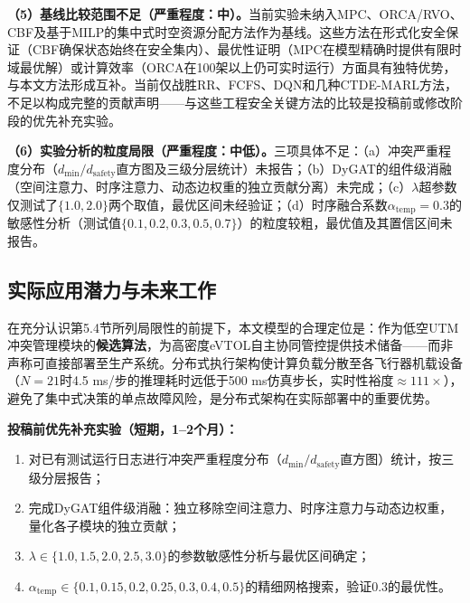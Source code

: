\documentclass[12pt,a4paper,UTF8]{ctexart}
\begin{document}
\textbf{（5）基线比较范围不足（严重程度：中）。}当前实验未纳入MPC\cite{ref27}、ORCA/RVO\cite{ref22}、CBF\cite{ref23}及基于MILP的集中式时空资源分配方法作为基线。这些方法在形式化安全保证（CBF确保状态始终在安全集内）、最优性证明（MPC在模型精确时提供有限时域最优解）或计算效率（ORCA在100架以上仍可实时运行）方面具有独特优势，与本文方法形成互补。当前仅战胜RR、FCFS、DQN和几种CTDE-MARL方法，不足以构成完整的贡献声明——与这些工程安全关键方法的比较是投稿前或修改阶段的优先补充实验。

\textbf{（6）实验分析的粒度局限（严重程度：中低）。}三项具体不足：（a）冲突严重程度分布（$d_{\min}/d_{\text{safety}}$直方图及三级分层统计）未报告；（b）DyGAT的组件级消融（空间注意力、时序注意力、动态边权重的独立贡献分离）未完成；（c）$\lambda$超参数仅测试了$\{1.0, 2.0\}$两个取值，最优区间未经验证；（d）时序融合系数$\alpha_{\text{temp}}=0.3$的敏感性分析（测试值$\{0.1, 0.2, 0.3, 0.5, 0.7\}$）的粒度较粗，最优值及其置信区间未报告。

\subsection{实际应用潜力与未来工作}

在充分认识第5.4节所列局限性的前提下，本文模型的合理定位是：作为低空UTM冲突管理模块的\textbf{候选算法}，为高密度eVTOL自主协同管控提供技术储备——而非声称可直接部署至生产系统。分布式执行架构使计算负载分散至各飞行器机载设备（$N=21$时4.5 ms/步的推理耗时远低于500 ms仿真步长，实时性裕度$\approx 111\times$），避免了集中式决策的单点故障风险，是分布式架构在实际部署中的重要优势。

\textbf{投稿前优先补充实验（短期，1--2个月）：}
\begin{enumerate}[label=(\arabic*)]
    \item 对已有测试运行日志进行冲突严重程度分布（$d_{\min}/d_{\text{safety}}$直方图）统计，按三级分层报告；
    \item 完成DyGAT组件级消融：独立移除空间注意力、时序注意力与动态边权重，量化各子模块的独立贡献；
    \item $\lambda \in \{1.0, 1.5, 2.0, 2.5, 3.0\}$的参数敏感性分析与最优区间确定；
    \item $\alpha_{\text{temp}} \in \{0.1, 0.15, 0.2, 0.25, 0.3, 0.4, 0.5\}$的精细网格搜索，验证0.3的最优性。
\end{enumerate}
\end{document}
